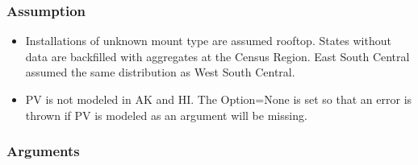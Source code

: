 \subsubsection{Assumption}\label{assumption-75}

\begin{itemize}
 
\item
  Installations of unknown mount type are assumed rooftop. States
  without data are backfilled with aggregates at the Census Region.
  \textquotesingle East South Central\textquotesingle{} assumed the same
  distribution as \textquotesingle West South Central\textquotesingle.
\item
  PV is not modeled in AK and HI. The Option=None is set so that an
  error is thrown if PV is modeled as an argument will be missing.
\end{itemize}

\subsubsection{Arguments}\label{arguments-91}

